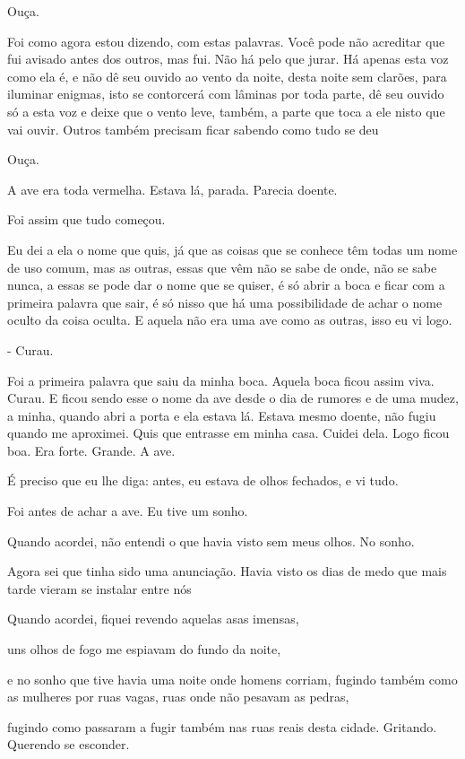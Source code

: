 Ouça.

Foi como agora estou dizendo, com estas palavras. Você pode não
acreditar que fui avisado antes dos outros, mas fui. Não há pelo que
jurar. Há apenas esta voz como ela é, e não dê seu ouvido ao vento da
noite, desta noite sem clarões, para iluminar enigmas, isto se
contorcerá com lâminas por toda parte, dê seu ouvido só a esta voz e
deixe que o vento leve, também, a parte que toca a ele nisto que vai
ouvir. Outros também precisam ficar sabendo como tudo se deu

Ouça.

A ave era toda vermelha. Estava lá, parada. Parecia doente.

Foi assim que tudo começou.

Eu dei a ela o nome que quis, já que as coisas que se conhece têm todas
um nome de uso comum, mas as outras, essas que vêm não se sabe de onde,
não se sabe nunca, a essas se pode dar o nome que se quiser, é só abrir
a boca e ficar com a primeira palavra que sair, é só nisso que há uma
possibilidade de achar o nome oculto da coisa oculta. E aquela não era
uma ave como as outras, isso eu vi logo.

- Curau.

Foi a primeira palavra que saiu da minha boca. Aquela boca ficou assim
viva. Curau. E ficou sendo esse o nome da ave desde o dia de rumores e
de uma mudez, a minha, quando abri a porta e ela estava lá. Estava mesmo
doente, não fugiu quando me aproximei. Quis que entrasse em minha casa.
Cuidei dela. Logo ficou boa. Era forte. Grande. A ave.

É preciso que eu lhe diga: antes, eu estava de olhos fechados, e vi
tudo.

Foi antes de achar a ave. Eu tive um sonho.

Quando acordei, não entendi o que havia visto sem meus olhos. No sonho.

Agora sei que tinha sido uma anunciação. Havia visto os dias de medo que
mais tarde vieram se instalar entre nós

Quando acordei, fiquei revendo aquelas asas imensas,

uns olhos de fogo me espiavam do fundo da noite,

e no sonho que tive havia uma noite onde homens corriam, fugindo também
como as mulheres por ruas vagas, ruas onde não pesavam as pedras,

fugindo como passaram a fugir também nas ruas reais desta cidade.
Gritando. Querendo se esconder.

